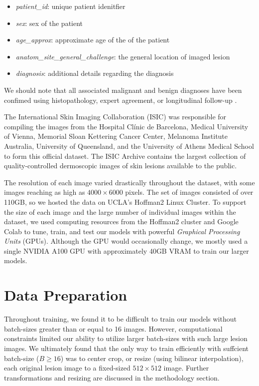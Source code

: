 \documentclass [MAS] {uclathes}
\begin{document}
\begin{itemize}
    \item \textit{patient\_id}: unique patient idenitfier
    \item \textit{sex}: sex of the patient 
    \item \textit{age\_approx}: approximate age of the of the patient
    \item \textit{anatom\_site\_general\_challenge}: the general location of imaged lesion
    \item \textit{diagnosis}: additional details regarding the diagnosis
\end{itemize}

We should note that all associated malignant and benign diagnoses have been confimed using histopathology, expert agreement, or longitudinal follow-up \cite{ISIC}.

The International Skin Imaging Collaboration (ISIC) was responsible for compiling the images from the Hospital Clínic de Barcelona, Medical University of Vienna, Memorial Sloan Kettering Cancer Center, Melanoma Institute Australia, University of Queensland, and the University of Athens Medical School to form this official dataset. The ISIC Archive contains the largest collection of quality-controlled dermoscopic images of skin lesions available to the public. 

The resolution of each image varied drastically throughout the dataset, with some images reaching as high as $4000 \times 6000$ pixels. The set of images consisted of over 110GB, so we hosted the data on UCLA's Hoffman2 Linux Cluster. To support the size of each image and the large number of individual images within the dataset, we used computing resources from the Hoffman2 cluster and Google Colab to tune, train, and test our models with powerful \textit{Graphical Processing Units} (GPUs). Although the GPU would occasionally change, we mostly used a single NVIDIA A100 GPU with approximately 40GB VRAM to train our larger models.

\section{Data Preparation}

Throughout training, we found it to be difficult to train our models without batch-sizes greater than or equal to 16 images. However, computational constraints limited our ability to utilize larger batch-sizes with such large lesion images. We ultimately found that the only way to train efficiently with suffcient batch-size ($B \geq 16$) was to center crop, or resize (using bilinear interpolation), each original lesion image to a fixed-sized $512 \times 512$ image. Further transformations and resizing are discussed in the methodology section.
\end{document}
